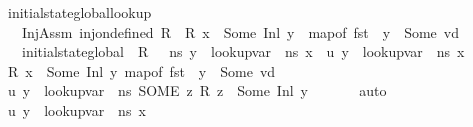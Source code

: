 \begin{isabellebody}
\isanewline
{}\isamarkupfalse%
\ initial{\isacharunderscore}{\kern0pt}state{\isacharunderscore}{\kern0pt}global{\isacharunderscore}{\kern0pt}lookup{\isacharcolon}{\kern0pt}\ \isanewline
\ \ \ InjAssm{\isacharcolon}{\kern0pt}\ {\isachardoublequoteopen}inj{\isacharunderscore}{\kern0pt}on{\isacharunderscore}{\kern0pt}defined\ R{\isachardoublequoteclose}\ \ {\isachardoublequoteopen}R\ x\ {\isacharequal}{\kern0pt}\ Some\ {\isacharparenleft}{\kern0pt}Inl\ y{\isacharparenright}{\kern0pt}{\isachardoublequoteclose}\ \ {\isachardoublequoteopen}map{\isacharunderscore}{\kern0pt}of\ {\isacharparenleft}{\kern0pt}fst\ {\isasymLambda}{\isacharprime}{\kern0pt}{\isacharparenright}{\kern0pt}\ y\ {\isacharequal}{\kern0pt}\ Some\ vd{\isachardoublequoteclose}\isanewline
\ \ \ {\isachardoublequoteopen}initial{\isacharunderscore}{\kern0pt}state{\isacharunderscore}{\kern0pt}global\ {\isasymOmega}\ R\ {\isasymLambda}\ {\isasymLambda}{\isacharprime}{\kern0pt}\ ns\ y\ {\isacharequal}{\kern0pt}\ lookup{\isacharunderscore}{\kern0pt}var\ {\isasymLambda}\ ns\ x{\isachardoublequoteclose}\ {\isacharparenleft}{\kern0pt}\ {\isachardoublequoteopen}{\isacharquery}{\kern0pt}u\ y\ {\isacharequal}{\kern0pt}\ lookup{\isacharunderscore}{\kern0pt}var\ {\isasymLambda}\ ns\ x{\isachardoublequoteclose}{\isacharparenright}{\kern0pt}\isanewline
%
\isadelimproof
%
\endisadelimproof
%
\isatagproof
{}\isamarkupfalse%
\ {\isacharminus}{\kern0pt}\isanewline
\ \ \isamarkupfalse%
\ {\isacartoucheopen}R\ x\ {\isacharequal}{\kern0pt}\ Some\ {\isacharparenleft}{\kern0pt}Inl\ y{\isacharparenright}{\kern0pt}{\isacartoucheclose}\ {\isacartoucheopen}map{\isacharunderscore}{\kern0pt}of\ {\isacharparenleft}{\kern0pt}fst\ {\isasymLambda}{\isacharprime}{\kern0pt}{\isacharparenright}{\kern0pt}\ y\ {\isacharequal}{\kern0pt}\ Some\ vd{\isacartoucheclose}\ \isamarkupfalse%
\ {\isachardoublequoteopen}{\isacharquery}{\kern0pt}u\ y\ {\isacharequal}{\kern0pt}\ {\isacharparenleft}{\kern0pt}lookup{\isacharunderscore}{\kern0pt}var\ {\isasymLambda}\ ns\ {\isacharparenleft}{\kern0pt}SOME\ z{\isachardot}{\kern0pt}\ R\ z\ {\isacharequal}{\kern0pt}\ Some\ {\isacharparenleft}{\kern0pt}Inl\ y{\isacharparenright}{\kern0pt}{\isacharparenright}{\kern0pt}{\isacharparenright}{\kern0pt}{\isachardoublequoteclose}\ \isanewline
\ \ \ \ \isamarkupfalse%
\ auto\isanewline
\ \ \isamarkupfalse%
\ {\isachardoublequoteopen}{\isacharquery}{\kern0pt}u\ y\ {\isacharequal}{\kern0pt}\ lookup{\isacharunderscore}{\kern0pt}var\ {\isasymLambda}\ ns\ x{\isachardoublequoteclose}\ \isamarkupfalse%

\end{isabellebody}
